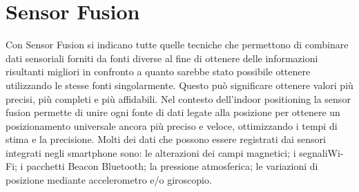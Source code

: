 \section{Sensor Fusion}

Con Sensor Fusion si indicano tutte quelle tecniche che permettono di combinare dati sensoriali forniti da fonti diverse al fine di ottenere delle informazioni risultanti migliori in confronto a quanto sarebbe stato possibile ottenere utilizzando le stesse fonti singolarmente. Questo può significare ottenere valori più precisi, più completi e più affidabili.
Nel contesto dell’indoor positioning la sensor fusion permette di unire ogni fonte
di dati legate alla posizione per ottenere un posizionamento universale ancora più preciso
e veloce, ottimizzando i tempi di stima e la precisione.
Molti dei dati che possono essere registrati dai sensori integrati negli smartphone
sono: le alterazioni dei campi magnetici; i segnaliWi-Fi; i pacchetti Beacon Bluetooth; la
pressione atmosferica; le variazioni di posizione mediante accelerometro e/o giroscopio.





